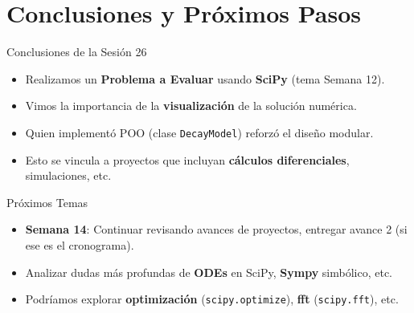 \documentclass[10pt]{beamer}
\begin{document}
\section{Conclusiones y Próximos Pasos}

\begin{frame}{Conclusiones de la Sesión 26}
  \begin{itemize}
    \item Realizamos un \textbf{Problema a Evaluar} usando \textbf{SciPy} (tema Semana 12).
    \item Vimos la importancia de la \textbf{visualización} de la solución numérica.
    \item Quien implementó POO (clase \texttt{DecayModel}) reforzó el diseño modular.
    \item Esto se vincula a proyectos que incluyan \textbf{cálculos diferenciales}, simulaciones, etc.
  \end{itemize}
\end{frame}

\begin{frame}{Próximos Temas}
  \begin{itemize}
    \item \textbf{Semana 14}: Continuar revisando avances de proyectos, entregar avance 2 (si ese es el cronograma).
    \item Analizar dudas más profundas de \textbf{ODEs} en SciPy, \textbf{Sympy} simbólico, etc.
    \item Podríamos explorar \textbf{optimización} (\texttt{scipy.optimize}), \textbf{fft} (\texttt{scipy.fft}), etc.
  \end{itemize}
\end{frame}
\end{document}
